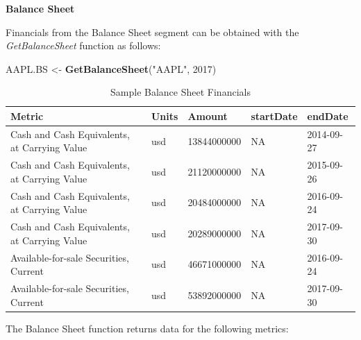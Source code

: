 \documentclass[]{book}
\newenvironment{Shaded}{\begin{snugshade}}{\end{snugshade}}
\newcommand{\KeywordTok}[1]{\textcolor[rgb]{0.13,0.29,0.53}{\textbf{#1}}}
\newcommand{\DecValTok}[1]{\textcolor[rgb]{0.00,0.00,0.81}{#1}}
\newcommand{\StringTok}[1]{\textcolor[rgb]{0.31,0.60,0.02}{#1}}
\newcommand{\NormalTok}[1]{#1}
\theoremstyle{definition}
\theoremstyle{definition}
\theoremstyle{definition}
\theoremstyle{remark}
\begin{document}
\textbf{Balance Sheet}

Financials from the Balance Sheet segment can be obtained with the
\emph{GetBalanceSheet} function as follows:

\begin{Shaded}
\begin{Highlighting}[]
\NormalTok{AAPL.BS <-}\StringTok{ }\KeywordTok{GetBalanceSheet}\NormalTok{(}\StringTok{"AAPL"}\NormalTok{, }\DecValTok{2017}\NormalTok{)}
\end{Highlighting}
\end{Shaded}

\begin{table}[t]

\caption{\label{tab:unnamed-chunk-28}Sample Balance Sheet Financials}
\centering
\begin{tabular}{lllll}
\toprule
Metric & Units & Amount & startDate & endDate\\
\midrule
Cash and Cash Equivalents, at Carrying Value & usd & 13844000000 & NA & 2014-09-27\\
Cash and Cash Equivalents, at Carrying Value & usd & 21120000000 & NA & 2015-09-26\\
Cash and Cash Equivalents, at Carrying Value & usd & 20484000000 & NA & 2016-09-24\\
Cash and Cash Equivalents, at Carrying Value & usd & 20289000000 & NA & 2017-09-30\\
Available-for-sale Securities, Current & usd & 46671000000 & NA & 2016-09-24\\
\addlinespace
Available-for-sale Securities, Current & usd & 53892000000 & NA & 2017-09-30\\
\bottomrule
\end{tabular}
\end{table}

The Balance Sheet function returns data for the following metrics:
\end{document}
